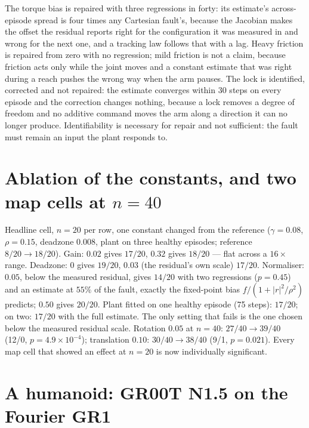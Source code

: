 \documentclass[11pt,a4paper]{article}
\begin{document}
The torque bias is repaired with three regressions in forty: its estimate's across-episode
spread is four times any Cartesian fault's, because the Jacobian makes the offset the residual
reports right for the configuration it was measured in and wrong for the next one, and a
tracking law follows that with a lag. Heavy friction is repaired from zero with no
regression; mild friction is not a claim, because friction acts only while the joint moves
and a constant estimate that was right during a reach pushes the wrong way when the arm
pauses. The lock is identified, corrected and not repaired: the estimate converges within 30
steps on every episode and the correction changes nothing, because a lock removes a degree
of freedom and no additive command moves the arm along a direction it can no longer
produce. Identifiability is necessary for repair and not sufficient: the fault must remain
an input the plant responds to.

\section{Ablation of the constants, and two map cells at $n=40$}
\label{sec:ablation}

Headline cell, $n=20$ per row, one constant changed from the reference ($\gamma=0.08$,
$\rho=0.15$, deadzone $0.008$, plant on three healthy episodes; reference $8/20\to18/20$).
Gain: $0.02$ gives $17/20$, $0.32$ gives $18/20$ --- flat across a $16\times$ range. Deadzone:
$0$ gives $19/20$, $0.03$ (the residual's own scale) $17/20$. Normaliser: $0.05$, below the
measured residual, gives $14/20$ with two regressions ($p=0.45$) and an estimate at $55\%$ of
the fault, exactly the fixed-point bias $f/(1+|r|^2/\rho^2)$ predicts; $0.50$ gives $20/20$.
Plant fitted on one healthy episode (75 steps): $17/20$; on two: $17/20$ with the full
estimate. The only setting that fails is the one chosen below the measured residual scale.
Rotation $0.05$ at $n=40$: $27/40\to39/40$ (12/0, $p=4.9\times10^{-4}$); translation $0.10$:
$30/40\to38/40$ (9/1, $p=0.021$). Every map cell that showed an effect at $n=20$ is now
individually significant.

\section{A humanoid: GR00T N1.5 on the Fourier GR1}
\label{sec:gr1}
\end{document}
